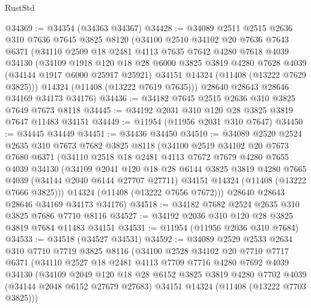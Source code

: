 \begin{lexlean}{RustStd}
\begin{coremodule}
@34369 := @34354 (@34363 @34367)
@34428 := @34089
    @2511
    @2515
    @2636
    @310
    @7636
    @7645
    @3825
    @8120
    (@34100
      @2510
      @34102
      @20
      @7636
      @7643
      @6371
      (@34110
        @2509
        @18
        @2481
        @4113
        @7635
        @7642
        @4280
        @7618
        @4039
        @34130
        (@34109
          @1918
          @120
          @18
          @28
          @6000
          @3825
          @3819
          @4280
          @7628
          @4039
          (@34144 @1917 @6000 @25917 @25921)
          @34151
          @14324
          (@11408 (@13222 @7629 @3825)))
        @14324
        (@11408 (@13222 @7619 @7635)))
      @28640
      @28643
      @28646
      @34169
      @34173
      @34176)
@34436 := @34182 @7645 @2515 @2636 @310 @3825 @7649 @7673 @8118
@34445 := @34192 @2031 @310 @120 @28 @3825 @3819 @7647 @11483 @34151
@34449 := @11954 (@11956 @2031 @310 @7647)
@34450 := @34445 @34449
@34451 := @34436 @34450
@34510 := @34089
    @2520
    @2524
    @2635
    @310
    @7673
    @7682
    @3825
    @8118
    (@34100
      @2519
      @34102
      @20
      @7673
      @7680
      @6371
      (@34110
        @2518
        @18
        @2481
        @4113
        @7672
        @7679
        @4280
        @7655
        @4039
        @34130
        (@34109
          @2041
          @120
          @18
          @28
          @6144
          @3825
          @3819
          @4280
          @7665
          @4039
          (@34144 @2040 @6144 @27707 @27711)
          @34151
          @14324
          (@11408 (@13222 @7666 @3825)))
        @14324
        (@11408 (@13222 @7656 @7672)))
      @28640
      @28643
      @28646
      @34169
      @34173
      @34176)
@34518 := @34182 @7682 @2524 @2635 @310 @3825 @7686 @7710 @8116
@34527 := @34192 @2036 @310 @120 @28 @3825 @3819 @7684 @11483 @34151
@34531 := @11954 (@11956 @2036 @310 @7684)
@34533 := @34518 (@34527 @34531)
@34592 := @34089
    @2529
    @2533
    @2634
    @310
    @7710
    @7719
    @3825
    @8116
    (@34100
      @2528
      @34102
      @20
      @7710
      @7717
      @6371
      (@34110
        @2527
        @18
        @2481
        @4113
        @7709
        @7716
        @4280
        @7692
        @4039
        @34130
        (@34109
          @2049
          @120
          @18
          @28
          @6152
          @3825
          @3819
          @4280
          @7702
          @4039
          (@34144 @2048 @6152 @27679 @27683)
          @34151
          @14324
          (@11408 (@13222 @7703 @3825)))

\end{coremodule}
\end{lexlean}
